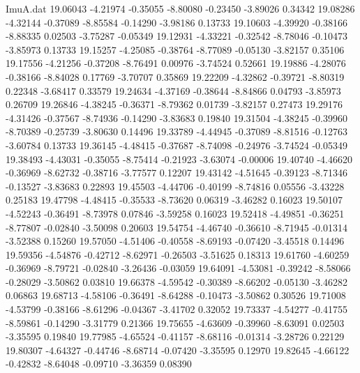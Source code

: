 \begin{filecontents}{ImuA.dat}
  19.06043   -4.21974   -0.35055   -8.80080   -0.23450   -3.89026    0.34342
  19.08286   -4.32144   -0.37089   -8.85584   -0.14290   -3.98186    0.13733
  19.10603   -4.39920   -0.38166   -8.88335    0.02503   -3.75287   -0.05349
  19.12931   -4.33221   -0.32542   -8.78046   -0.10473   -3.85973    0.13733
  19.15257   -4.25085   -0.38764   -8.77089   -0.05130   -3.82157    0.35106
  19.17556   -4.21256   -0.37208   -8.76491    0.00976   -3.74524    0.52661
  19.19886   -4.28076   -0.38166   -8.84028    0.17769   -3.70707    0.35869
  19.22209   -4.32862   -0.39721   -8.80319    0.22348   -3.68417    0.33579
  19.24634   -4.37169   -0.38644   -8.84866    0.04793   -3.85973    0.26709
  19.26846   -4.38245   -0.36371   -8.79362    0.01739   -3.82157    0.27473
  19.29176   -4.31426   -0.37567   -8.74936   -0.14290   -3.83683    0.19840
  19.31504   -4.38245   -0.39960   -8.70389   -0.25739   -3.80630    0.14496
  19.33789   -4.44945   -0.37089   -8.81516   -0.12763   -3.60784    0.13733
  19.36145   -4.48415   -0.37687   -8.74098   -0.24976   -3.74524   -0.05349
  19.38493   -4.43031   -0.35055   -8.75414   -0.21923   -3.63074   -0.00006
  19.40740   -4.46620   -0.36969   -8.62732   -0.38716   -3.77577    0.12207
  19.43142   -4.51645   -0.39123   -8.71346   -0.13527   -3.83683    0.22893
  19.45503   -4.44706   -0.40199   -8.74816    0.05556   -3.43228    0.25183
  19.47798   -4.48415   -0.35533   -8.73620    0.06319   -3.46282    0.16023
  19.50107   -4.52243   -0.36491   -8.73978    0.07846   -3.59258    0.16023
  19.52418   -4.49851   -0.36251   -8.77807   -0.02840   -3.50098    0.20603
  19.54754   -4.46740   -0.36610   -8.71945   -0.01314   -3.52388    0.15260
  19.57050   -4.51406   -0.40558   -8.69193   -0.07420   -3.45518    0.14496
  19.59356   -4.54876   -0.42712   -8.62971   -0.26503   -3.51625    0.18313
  19.61760   -4.60259   -0.36969   -8.79721   -0.02840   -3.26436   -0.03059
  19.64091   -4.53081   -0.39242   -8.58066   -0.28029   -3.50862    0.03810
  19.66378   -4.59542   -0.30389   -8.66202   -0.05130   -3.46282    0.06863
  19.68713   -4.58106   -0.36491   -8.64288   -0.10473   -3.50862    0.30526
  19.71008   -4.53799   -0.38166   -8.61296   -0.04367   -3.41702    0.32052
  19.73337   -4.54277   -0.41755   -8.59861   -0.14290   -3.31779    0.21366
  19.75655   -4.63609   -0.39960   -8.63091    0.02503   -3.35595    0.19840
  19.77985   -4.65524   -0.41157   -8.68116   -0.01314   -3.28726    0.22129
  19.80307   -4.64327   -0.44746   -8.68714   -0.07420   -3.35595    0.12970
  19.82645   -4.66122   -0.42832   -8.64048   -0.09710   -3.36359    0.08390

\end{filecontents}
